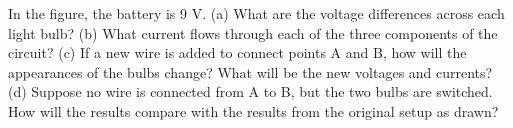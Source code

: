         In the figure, the battery is 9 V.  \hwendpart
        (a) What are the
        voltage differences across each light bulb?\answercheck  \hwendpart
        (b) What
        current flows through each of the three components of the
        circuit?  \answercheck\hwendpart
        (c) If a new wire is added to connect points A and
        B, how will the appearances of the bulbs change?  What
        will be the new voltages and currents?  \hwendpart
        (d) Suppose no wire
        is connected from A to B, but the two bulbs are switched. 
        How will the results compare with the results from the
        original setup as drawn?

